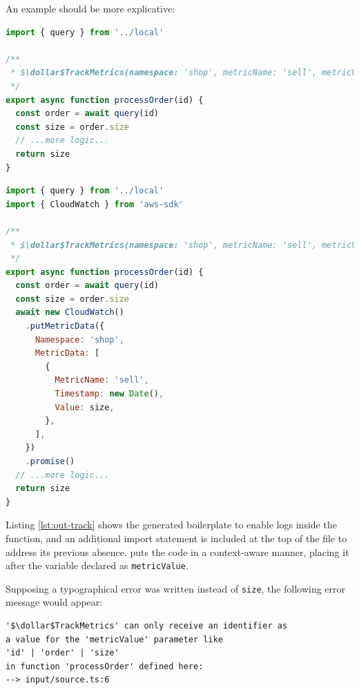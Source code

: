 An example should be more explicative:
\begin{lstlisting}[language=javascript, caption={Input code for \annotation{$\dollar$TrackMetrics}}]
import { query } from '../local'

/**
 * $\dollar$TrackMetrics(namespace: 'shop', metricName: 'sell', metricValue: size)
 */
export async function processOrder(id) {
  const order = await query(id)
  const size = order.size
  // ...more logic...
  return size
}
\end{lstlisting}


\begin{lstlisting}[language=javascript, caption={Output code from \annotation{$\dollar$TrackMetrics}}, label={lst:out-track}]
import { query } from '../local'
import { CloudWatch } from 'aws-sdk'

/**
 * $\dollar$TrackMetrics(namespace: 'shop', metricName: 'sell', metricValue: size)
 */
export async function processOrder(id) {
  const order = await query(id)
  const size = order.size
  await new CloudWatch()
    .putMetricData({
      Namespace: 'shop',
      MetricData: [
        {
          MetricName: 'sell',
          Timestamp: new Date(),
          Value: size,
        },
      ],
    })
    .promise()
  // ...more logic...
  return size
}
\end{lstlisting}

Listing \ref{lst:out-track} shows the generated boilerplate to enable logs inside the function,
and an additional import statement is included at the top of the file to address its previous absence.
 puts the code in a context-aware manner,
placing it after the variable declared as \verb|metricValue|.

Supposing a typographical error was written instead of \verb|size|, the following error message would appear:
\begin{lstlisting}[language=console]
'$\dollar$TrackMetrics' can only receive an identifier as
a value for the 'metricValue' parameter like
'id' | 'order' | 'size'
in function 'processOrder' defined here:
--> input/source.ts:6
\end{lstlisting}

